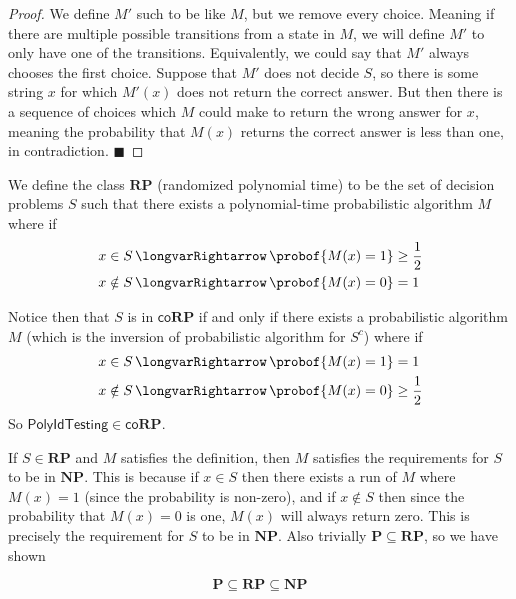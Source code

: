 \documentclass[10pt]{article}
\def\implies{\,\longvarRightarrow\,}
\def\polyidtest{\mathsf{PolyIdTesting}}
\def\P{\mathbf{P}}
\def\NP{\mathbf{NP}}
\def\co{\mathsf{co}}
\def\RP{\mathbf{RP}}
\def\qed{%
    \ifmmode%
        \eqno\blacksquare%
    \else%
        \hskip1cm\allowbreak\hbox{}\nobreak\hfill$\blacksquare$%
    \fi%
}
\begin{document}
\begin{proof}

    We define $M'$ such to be like $M$, but we remove every choice.
    Meaning if there are multiple possible transitions from a state in $M$, we will define $M'$ to only have one of the transitions.
    Equivalently, we could say that $M'$ always chooses the first choice.
    Suppose that $M'$ does not decide $S$, so there is some string $x$ for which $M'(x)$ does not return the correct answer.
    But then there is a sequence of choices which $M$ could make to return the wrong answer for $x$, meaning the probability that $M(x)$ returns the correct answer is less than one, in contradiction.
    \qed

\end{proof}

\begin{defn*}

    We define the class $\RP$ (randomized polynomial time) to be the set of decision problems $S$ such that there exists a polynomial-time probabilistic algorithm $M$ where if
    \begin{align*}
        x\in S &\implies \probof{M(x)=1}\geq\frac12 \\ 
        x\notin S&\implies \probof{M(x)=0}=1
    \end{align*}

\end{defn*}

Notice then that $S$ is in $\co\RP$ if and only if there exists a probabilistic algorithm $M$ (which is the inversion of probabilistic algorithm for $S^c$) where if
\begin{align*}
    x\in S &\implies \probof{M(x)=1}=1 \\
    x\notin S &\implies \probof{M(x)=0}\geq\frac12
\end{align*}
So $\polyidtest\in\co\RP$.

If $S\in\RP$ and $M$ satisfies the definition, then $M$ satisfies the requirements for $S$ to be in $\NP$.
This is because if $x\in S$ then there exists a run of $M$ where $M(x)=1$ (since the probability is non-zero), and if $x\notin S$ then since the probability that $M(x)=0$ is one, $M(x)$ will always return
zero.
This is precisely the requirement for $S$ to be in $\NP$.
Also trivially $\P\subseteq\RP$, so we have shown

\begin{prop*}

    \[ \P \subseteq \RP \subseteq \NP \]

\end{prop*}
\end{document}
